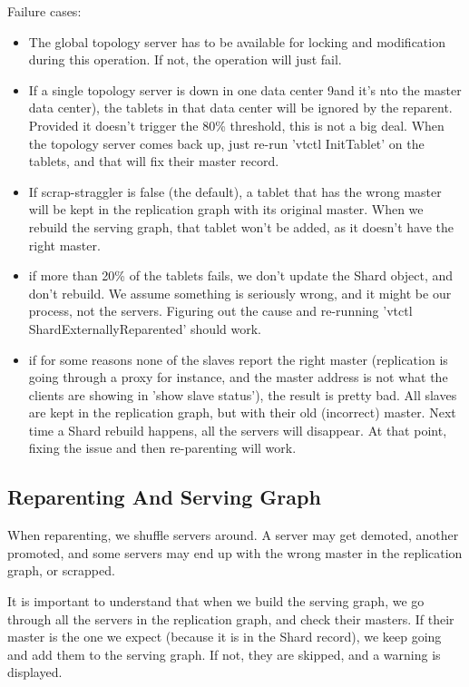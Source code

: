 Failure cases:

\begin{itemize}
\item The global topology server has to be available for locking and modification during this operation. If not, the operation will just fail.
\item If a single topology server is down in one data center 9and it's nto the master data center), the tablets in that data center will be ignored by the reparent. Provided it doesn't trigger the 80\% threshold, this is not a big deal. When the topology server comes back up, just re-run 'vtctl InitTablet' on the tablets, and that will fix their master record.
\item If scrap-straggler is false (the default), a tablet that has the wrong master will be kept in the replication graph with its original master. When we rebuild the serving graph, that tablet won't be added, as it doesn't have the right master.
\item if more than 20\% of the tablets fails, we don't update the Shard object, and don't rebuild. We assume something is seriously wrong, and it might be our process, not the servers. Figuring out the cause and re-running 'vtctl ShardExternallyReparented' should work.
\item if for some reasons none of the slaves report the right master (replication is going through a proxy for instance, and the master address is not what the clients are showing in 'show slave status'), the result is pretty bad. All slaves are kept in the replication graph, but with their old (incorrect) master. Next time a Shard rebuild happens, all the servers will disappear. At that point, fixing the issue and then re-parenting will work.
\end{itemize}

\subsection{Reparenting And Serving Graph}\label{reparenting-and-serving-graph}

When reparenting, we shuffle servers around. A server may get demoted, another promoted, and some servers may end up with the wrong master in the replication graph, or scrapped.

It is important to understand that when we build the serving graph, we go through all the servers in the replication graph, and check their masters. If their master is the one we expect (because it is in the Shard record), we keep going and add them to the serving graph. If not, they are skipped, and a warning is displayed.

